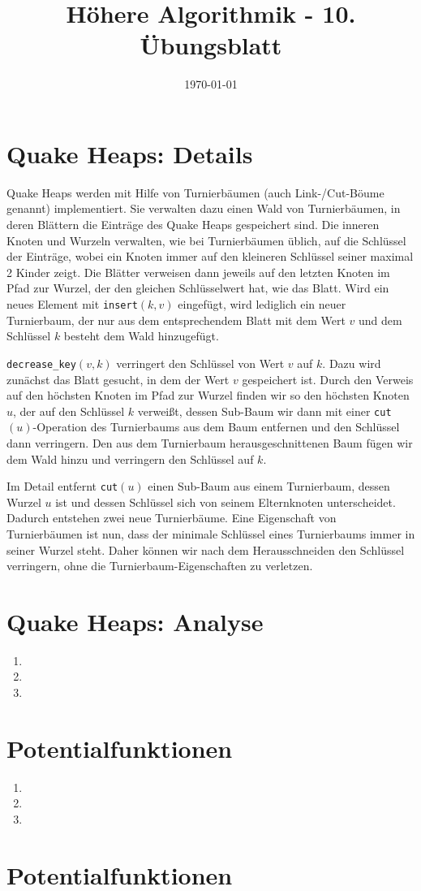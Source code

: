 \documentclass[a4paper,10pt]{article}
\title{H\"ohere Algorithmik - 10. \"Ubungsblatt}
\author{\Authors}
\date{\today}
\begin{document}
\maketitle

\section{Quake Heaps: Details}
Quake Heaps werden mit Hilfe von Turnierbäumen (auch Link-/Cut-Böume genannt) implementiert. Sie verwalten dazu einen Wald von Turnierbäumen, in deren Blättern die Einträge des Quake Heaps gespeichert sind. 
Die inneren Knoten und Wurzeln verwalten, wie bei Turnierbäumen üblich, auf die Schlüssel der Einträge, wobei ein Knoten immer auf den kleineren Schlüssel seiner maximal 2 Kinder zeigt.
Die Blätter verweisen dann jeweils auf den letzten Knoten im Pfad zur Wurzel, der den gleichen Schlüsselwert hat, wie das Blatt.
Wird ein neues Element mit \verb!insert!$(k,v)$ eingefügt, wird lediglich ein neuer Turnierbaum, der nur aus dem entsprechendem Blatt mit dem Wert $v$ und dem Schlüssel $k$ besteht dem Wald hinzugefügt.

\verb!decrease_key!$(v,k)$ verringert den Schlüssel von Wert $v$ auf $k$. Dazu wird zunächst das Blatt gesucht, in dem der Wert $v$ gespeichert ist. 
Durch den Verweis auf den höchsten Knoten im Pfad zur Wurzel finden wir so den höchsten Knoten $u$, der auf den Schlüssel $k$ verweißt, dessen Sub-Baum wir dann mit einer \verb!cut!$(u)$-Operation des Turnierbaums aus dem Baum entfernen und den Schlüssel dann verringern. 
Den aus dem Turnierbaum herausgeschnittenen Baum fügen wir dem Wald hinzu und verringern den Schlüssel auf $k$.

Im Detail entfernt \verb!cut!$(u)$ einen Sub-Baum aus einem Turnierbaum, dessen Wurzel $u$ ist und dessen Schlüssel sich von seinem Elternknoten unterscheidet. Dadurch entstehen zwei neue Turnierbäume.
Eine Eigenschaft von Turnierbäumen ist nun, dass der minimale Schlüssel eines Turnierbaums immer in seiner Wurzel steht.
Daher können wir nach dem Herausschneiden den Schlüssel verringern, ohne die Turnierbaum-Eigenschaften zu verletzen.


\section{Quake Heaps: Analyse}
\begin{enumerate}
\item   
\item   
\item   
\end{enumerate}

\section{Potentialfunktionen}
\begin{enumerate}
\item   
\item   
\item   
\end{enumerate}

\section{Potentialfunktionen}
\end{document}
